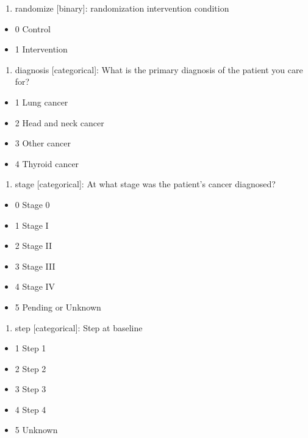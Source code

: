 \documentclass[
  letterpaper,
  DIV=11,
  numbers=noendperiod]{scrreprt}
\providecommand{\tightlist}{%
  \setlength{\itemsep}{0pt}\setlength{\parskip}{0pt}}\usepackage{longtable,booktabs,array}
\begin{document}
\begin{enumerate}
\def\labelenumi{\arabic{enumi}.}
\setcounter{enumi}{16}
\tightlist
\item
  randomize {[}binary{]}: randomization intervention condition
\end{enumerate}

\begin{itemize}
\tightlist
\item
  0 Control
\item
  1 Intervention
\end{itemize}

\begin{enumerate}
\def\labelenumi{\arabic{enumi}.}
\setcounter{enumi}{17}
\tightlist
\item
  diagnosis {[}categorical{]}: What is the primary diagnosis of the
  patient you care for?
\end{enumerate}

\begin{itemize}
\tightlist
\item
  1 Lung cancer
\item
  2 Head and neck cancer
\item
  3 Other cancer
\item
  4 Thyroid cancer
\end{itemize}

\begin{enumerate}
\def\labelenumi{\arabic{enumi}.}
\setcounter{enumi}{18}
\tightlist
\item
  stage {[}categorical{]}: At what stage was the patient's cancer
  diagnosed?
\end{enumerate}

\begin{itemize}
\tightlist
\item
  0 Stage 0
\item
  1 Stage I
\item
  2 Stage II
\item
  3 Stage III
\item
  4 Stage IV
\item
  5 Pending or Unknown
\end{itemize}

\begin{enumerate}
\def\labelenumi{\arabic{enumi}.}
\setcounter{enumi}{19}
\tightlist
\item
  step {[}categorical{]}: Step at baseline
\end{enumerate}

\begin{itemize}
\tightlist
\item
  1 Step 1
\item
  2 Step 2
\item
  3 Step 3
\item
  4 Step 4
\item
  5 Unknown
\end{itemize}
\end{document}
